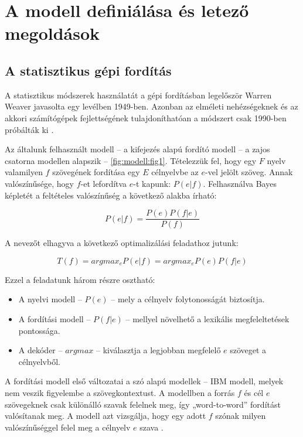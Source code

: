 \section{A modell definiálása és letező megoldások} \label{sec:model_definition}

\subsection{A statisztikus gépi fordítás}

A statisztikus módszerek használatát a gépi fordításban legelőször Warren Weaver javasolta egy levélben 1949-ben. Azonban az elméleti nehézségeknek és az akkori számítógépek fejlettségének tulajdoníthatóan a módszert csak 1990-ben próbálták ki \cite{Brown:1990:SAM:92858.92860}.

Az általunk felhasznált modell -- a kifejezés alapú fordító modell -- a zajos csatorna modellen alapszik -- \ref{fig:modell:fig1}. Tételezzük fel, hogy egy $F$ nyelv valamilyen $f$ szövegének fordítása egy $E$ célnyelvbe az $e$-vel jelölt szöveg. Annak valószínűsége, hogy $f$-et lefordítva $e$-t kapunk: $P(e|f)$. Felhasználva Bayes képletét a feltételes valószínűség a következő alakba írható:

\begin{equation}
	P(e|f) = \frac{P(e)P(f|e)}{P(f)}
\end{equation}

A nevezőt elhagyva a következő optimalizálási feladathoz jutunk:

\begin{equation}
	T(f) = argmax_e P(e|f) = argmax_e P(e)P(f|e)
\end{equation} 

Ezzel a feladatunk három részre osztható: 
\begin{itemize}
	\item
		A nyelvi modell --  $P(e)$ -- mely a célnyelv folytonosságát biztosítja.
	\item
		A fordítási modell --  $P(f|e)$ -- mellyel növelhető a lexikális megfeleltetések pontossága.
	\item
		A dekóder -- $argmax$ -- kiválasztja a legjobban megfelelő $e$ szöveget a célnyelvből.
\end{itemize}

A fordítási modell első változatai a szó alapú modellek -- IBM modell, melyek nem veszik figyelembe a szövegkontextust. A modellben a forrás $f$ és cél $e$ szövegeknek csak különálló szavak felelnek meg, így „word-to-word” fordítást valósítanak meg. A modell azt vizsgálja, hogy egy adott $f$ szónak milyen valószínűséggel felel meg a célnyelv $e$ szava \cite{Brown:1990:SAM:92858.92860} \cite{Berger:1994}.

